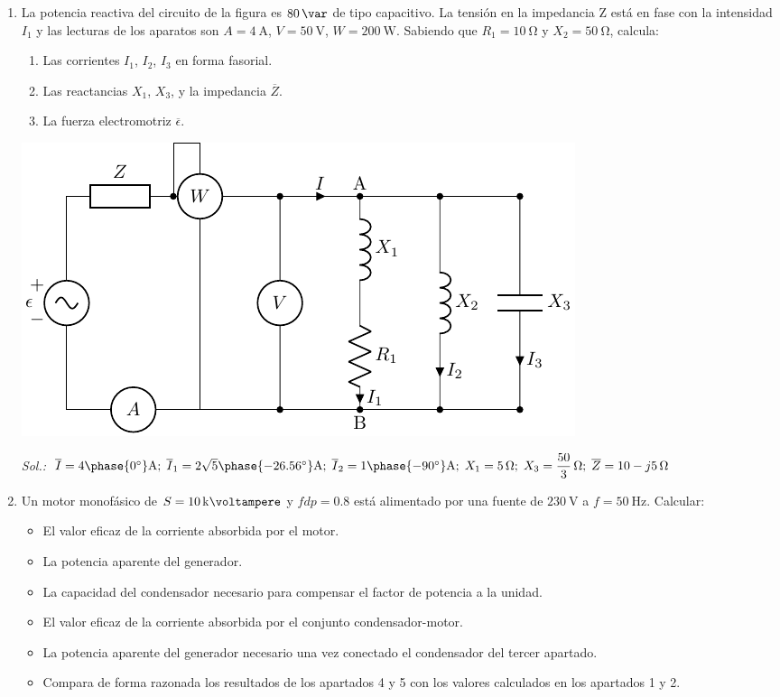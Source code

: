 \begin{enumerate}
\item La potencia reactiva del circuito de la figura es
  $\qty{80}{\var}$ de tipo capacitivo. La tensión en la
  impedancia Z está en fase con la intensidad $I_1$ y las lecturas de
  los aparatos son $A = \qty{4}{\ampere}$, $V = \qty{50}{\volt}$,
  $W = \qty{200}{\watt}$. Sabiendo que $R_1 = \qty{10}{\ohm}$ y
  $X_2 = \qty{50}{\ohm}$, calcula:

  \begin{enumerate}
  \item Las corrientes $I_1$, $I_2$, $I_3$ en forma fasorial.
  \item Las reactancias $X_1$, $X_3$, y la impedancia $\overline{Z}$.
  \item La fuerza electromotriz $\overline{\epsilon}$.
  \end{enumerate}
  \begin{center}
    \includegraphics{../figs/BT2_circuitoCapacitivo}
  \end{center}
  \emph{Sol.:\; 
    $\overline{I} =
    4\phase{\ang{0}}\unit{\ampere};\;
    \overline{I}_1 =
    2\sqrt{5}\phase{\ang{-26.56}}\unit{\ampere}
    ;\; \overline{I}_2 =
    1\phase{\ang{-90}}\unit{\ampere} ;\; X_1 =
    \qty{5}{\ohm};\; X_3 =
    \qty[parse-numbers=false]{\dfrac{50}{3}}{\ohm};\; \overline{Z} =
    \qty[parse-numbers=false]{10 - j5}{\ohm}$ }

\item Un motor monofásico de $S = \qty{10}{\kilo\voltampere}$ y $fdp = 0.8$ está
  alimentado por una fuente de $\qty{230}{\volt}$ a $f = \qty{50}{\hertz}$.  Calcular:
  \begin{itemize}
  \item El valor eficaz de la corriente absorbida por el motor.
  \item La potencia aparente del generador.
  \item La capacidad del condensador necesario para compensar el
    factor de potencia a la unidad.
  \item El valor eficaz de la corriente absorbida por el conjunto
    condensador-motor.
  \item La potencia aparente del generador necesario una vez conectado
    el condensador del tercer apartado.
  \item Compara de forma razonada los resultados de los apartados 4 y
    5 con los valores calculados en los apartados 1 y 2.
  \end{itemize}


\end{enumerate}
